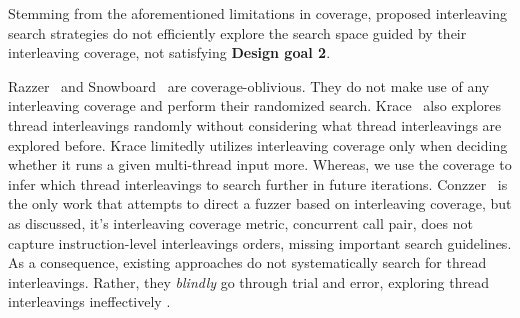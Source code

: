 







%
Stemming from the aforementioned limitations in coverage, 
proposed interleaving search strategies do not efficiently 
explore the search space guided by their interleaving coverage,
not satisfying \textbf{Design goal 2}.

Razzer~\cite{razzer} and Snowboard~\cite{snowboard} are coverage-oblivious.
They do not make use of any interleaving coverage 
and perform their randomized search. \dr{}
%
Krace~\cite{krace} also explores thread interleavings randomly without
considering what thread interleavings are explored before.  Krace
limitedly utilizes interleaving coverage only when deciding whether it
runs a given multi-thread input more. Whereas, we use the coverage to
infer which thread interleavings to search further in future
iterations.
%
Conzzer~\cite{conzzer} is the only work that attempts to direct a
fuzzer based on interleaving coverage, but as discussed,  
it's interleaving coverage metric, concurrent call pair, does not capture instruction-level interleavings orders, missing important 
search guidelines.
%
As a consequence, existing approaches do not systematically search for
thread interleavings.  Rather, they \textit{blindly} go through
trial and error, exploring thread interleavings ineffectively .

